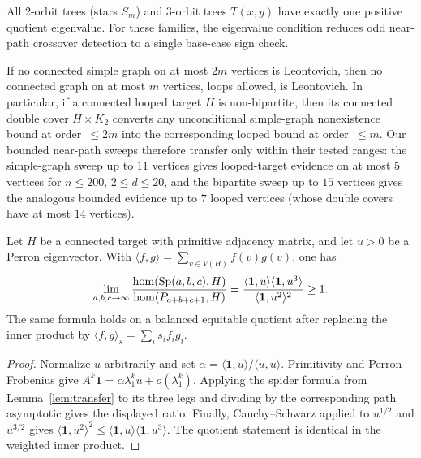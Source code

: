 \begin{corollary}
  \label{cor:2_and_3_orbit_trees}
  All 2-orbit trees (stars $S_m$) and 3-orbit trees $T(x,y)$ have
  exactly one positive quotient eigenvalue. For these families, the
  eigenvalue condition reduces odd near-path crossover detection to a
  single base-case sign check.
\end{corollary}

\begin{corollary}
  \label{cor:loopy_transfer}
  If no connected simple graph on at most $2m$ vertices is Leontovich,
  then no connected graph on at most $m$ vertices, loops allowed, is
  Leontovich. In particular, if a connected looped target $H$ is
  non-bipartite, then its connected double cover $H \times K_2$ converts
  any unconditional simple-graph nonexistence bound at order~$\le 2m$ into
  the corresponding looped bound at order~$\le m$. Our bounded near-path
  sweeps therefore transfer only within their tested ranges: the
  simple-graph sweep up to $11$ vertices gives looped-target evidence on at
  most $5$ vertices for $n \le 200$, $2 \le d \le 20$, and the bipartite sweep
  up to $15$ vertices gives the analogous bounded evidence up to
  $7$ looped vertices (whose double covers have at most $14$ vertices).
\end{corollary}

\begin{proposition}
  \label{prop:long-spider}
  Let $H$ be a connected target with primitive adjacency matrix, and let
  $u>0$ be a Perron eigenvector. With
  $\langle f,g\rangle=\sum_{v\in V(H)}f(v)g(v)$, one has
  \[
    \lim_{a,b,c\to\infty}
    \frac{\mathrm{hom}(\operatorname{Sp}(a,b,c),H)}{\mathrm{hom}(P_{a+b+c+1},H)}
    =
    \frac{\langle\mathbf 1,u\rangle\langle\mathbf 1,u^3\rangle}
         {\langle\mathbf 1,u^2\rangle^2}
    \ge 1.
  \]
  The same formula holds on a balanced equitable quotient after replacing the
  inner product by $\langle f,g\rangle_s=\sum_i s_i f_i g_i$.
\end{proposition}

\begin{proof}
  Normalize $u$ arbitrarily and set
  $\alpha=\langle\mathbf1,u\rangle/\langle u,u\rangle$. Primitivity and
  Perron--Frobenius give
  $A^k\mathbf1=\alpha\lambda_1^k u+o(\lambda_1^k)$. Applying the spider
  formula from Lemma~\ref{lem:transfer} to its three legs and dividing by the
  corresponding path asymptotic gives the displayed ratio. Finally,
  Cauchy--Schwarz applied to $u^{1/2}$ and $u^{3/2}$ gives
  $\langle\mathbf1,u^2\rangle^2\le
  \langle\mathbf1,u\rangle\langle\mathbf1,u^3\rangle$.
  The quotient statement is identical in the weighted inner product.
\end{proof}

